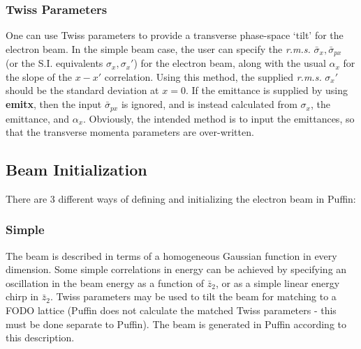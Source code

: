 \documentclass[12pt]{article}%
\begin{document}
\subsubsection{Twiss Parameters}

\label{section-twiss}

One can use Twiss parameters to provide a transverse phase-space `tilt' for the electron beam. In the simple beam case, the user can specify the \textit{r.m.s.} $\bar{\sigma}_x, \bar{\sigma}_{px}$ (or the S.I. equivalents $\sigma_x, \sigma_{x}'$) for the electron beam, along with the usual $\alpha_x$ for the slope of the $x-x'$ correlation. Using this method, the supplied \textit{r.m.s.} $\sigma_{x}'$ should be the standard deviation at $x=0$. If the emittance is supplied by using {\bf emitx}, then the input $\bar{\sigma}_{px}$ is ignored, and is instead calculated from $\sigma_x$, the emittance, and $\alpha_x$. Obviously, the intended method is to input the emittances, so that the transverse momenta parameters are over-written.















\subsection{Beam Initialization}
\label{beamfls}
There are 3 different ways of defining and initializing the electron beam in Puffin:

\subsubsection{Simple}

The beam is described in terms of a homogeneous Gaussian function in every dimension. Some simple correlations in energy can be achieved by specifying an oscillation in the beam energy as a function of $\bar{z}_2$, or as a simple linear energy chirp in $\bar{z}_2$. Twiss parameters may be used to tilt the beam for matching to a FODO lattice (Puffin does not calculate the matched Twiss parameters - this must be done separate to Puffin). The beam is generated in Puffin according to this description.
\end{document}
